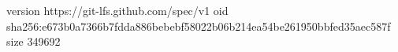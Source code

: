 version https://git-lfs.github.com/spec/v1
oid sha256:e673b0a7366b7fdda886bebebf58022b06b214ea54be261950bbfed35aec587f
size 349692
